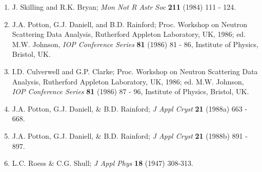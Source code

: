 \documentclass[letterpaper]{article}
\begin{document}
\begin{enumerate}
\item
        J. Skilling and R.K. Bryan; \emph{Mon Not R Astr Soc} 
        \textbf{211} (1984) 111 - 124.
\item
        J.A. Potton, G.J. Daniell, and B.D. Rainford; Proc. Workshop 
           on Neutron Scattering Data Analysis, Rutherford Appleton 
           Laboratory, UK, 1986;
           ed. M.W. Johnson, \emph{IOP Conference Series} 
           \textbf{81} (1986) 81 - 86, Institute
           of Physics, Bristol, UK.
\item
        I.D. Culverwell and G.P. Clarke; Proc. Workshop 
           on Neutron Scattering Data Analysis, Rutherford Appleton 
           Laboratory, UK, 1986;
           ed. M.W. Johnson, \emph{IOP Conference Series} 
           \textbf{81} (1986) 87 - 96, Institute
           of Physics, Bristol, UK.
\item
        J.A. Potton, G.J. Daniell, \& B.D. Rainford; 
           \emph{J Appl Cryst} \textbf{21}
           (1988a) 663 - 668.
\item
        J.A. Potton, G.J. Daniell, \& B.D. Rainford;
           \emph{J Appl Cryst} \textbf{21}
           (1988b) 891 - 897.
\item
        L.C. Roess \& C.G. Shull; 
           \emph{J Appl Phys} \textbf{18} (1947) 308-313.
\end{enumerate}
\end{document}
